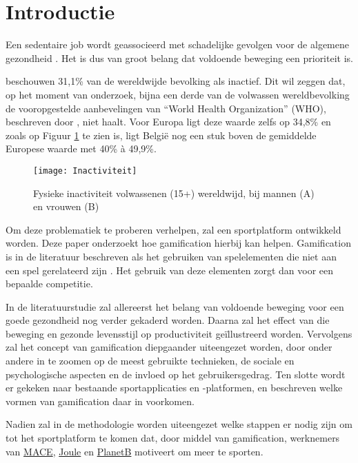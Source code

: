 
\section{Introductie}%
\label{sec:introductie}

Een sedentaire job wordt geassocieerd met schadelijke gevolgen voor de algemene gezondheid \autocite{Buckley2015}. Het is dus van groot belang dat voldoende beweging een prioriteit is.

\textcite{Hallal2012} beschouwen 31,1\% van de wereldwijde bevolking als inactief. Dit wil zeggen dat, op het moment van onderzoek, bijna een derde van de volwassen wereldbevolking de vooropgestelde aanbevelingen van ``World Health Organization'' (WHO), beschreven door \textcite{Bull2020}, niet haalt. Voor Europa ligt deze waarde zelfs op 34,8\% en zoals op Figuur \ref{fig:inactivity_prop} te zien is, ligt België nog een stuk boven de gemiddelde Europese waarde met 40\% à 49,9\%.

\begin{figure}[t]
    \caption[Fysieke inactiviteit bij volwassenen wereldwijd]{Fysieke inactiviteit volwassenen (15+) wereldwijd, bij mannen (A) en vrouwen (B) \autocite{Bull2020}}
    \texttt{[image: Inactiviteit]}
    \label{fig:inactivity_prop}
\end{figure}

Om deze problematiek te proberen verhelpen, zal een sportplatform ontwikkeld worden. Deze paper onderzoekt hoe gamification hierbij kan helpen. Gamification is in de literatuur beschreven als het gebruiken van spelelementen die niet aan een spel gerelateerd zijn \autocite{Gaalen2020}. Het gebruik van deze elementen zorgt dan voor een bepaalde competitie.

In de literatuurstudie zal allereerst het belang van voldoende beweging voor een goede gezondheid nog verder gekaderd worden. Daarna zal het effect van die beweging en gezonde levensstijl op productiviteit geïllustreerd worden. Vervolgens zal het concept van gamification diepgaander uiteengezet worden, door onder andere in te zoomen op de meest gebruikte technieken, de sociale en psychologische aspecten en de invloed op het gebruikersgedrag. Ten slotte wordt er gekeken naar bestaande sportapplicaties en -platformen, en beschreven welke vormen van gamification daar in voorkomen.

Nadien zal in de methodologie worden uiteengezet welke stappen er nodig zijn om tot het sportplatform te komen dat, door middel van gamification, werknemers van \href{https://www.-legal.com/}{MACE}, \href{https://www.joule.be/}{Joule} en \href{https://planetb.life/}{PlanetB} motiveert om meer te sporten.

